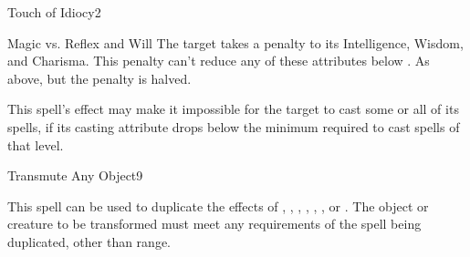 \begin{spellsection}{Touch of Idiocy}{2}
\begin{spellheader}
    \begin{spelltargetinginfo}
    \end{spelltargetinginfo}
\end{spellheader}
\begin{spellcontent}
    \begin{spelleffects}
        \begin{spellattack}{Magic vs. Reflex and Will}
            \spellsuccess[Reflex] The target takes a  penalty to its Intelligence, Wisdom, and Charisma. This penalty can't reduce any of these attributes below .
            \spellfailure[Will] As above, but the penalty is halved.
        \end{spellattack}
        \spelldur \durshort
    \end{spelleffects}
\end{spellcontent}
\begin{spellfooter}
    \spellnotes This spell's effect may make it impossible for the target to cast some or all of its spells, if its casting attribute drops below the minimum required to cast spells of that level.
\end{spellfooter}
\end{spellsection}

\begin{spellsection}{Transmute Any Object}{9}
\begin{spellheader}
    \spellrng{\rngmed}
\end{spellheader}
\begin{spellcontent}
    \spellspecial This spell can be used to duplicate the effects of , , , , , , or . The object or creature to be transformed must meet any requirements of the spell being duplicated, other than range.
\end{spellcontent}
\begin{spellfooter}
\end{spellfooter}
\end{spellsection}

